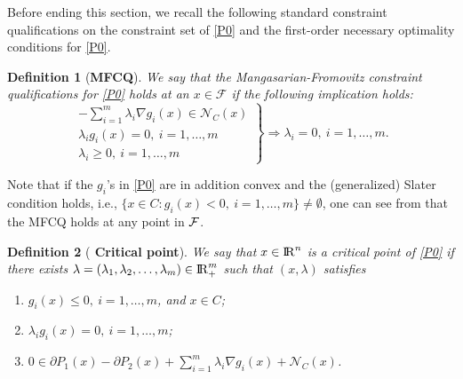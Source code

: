 \documentclass[10pt]{article}
\numberwithin{equation}{section}
\newtheorem{definition}{Definition}[section]
\def\R{{\rm I\!R}}
\begin{document}
Before ending this section, we recall the following standard constraint qualifications on the constraint set of \eqref{P0} and the first-order necessary optimality conditions for \eqref{P0}.
\begin{definition}[{{\bf MFCQ}}]\label{MFCQ1}
We say that the Mangasarian-Fromovitz constraint qualifications for \eqref{P0} holds at an $x\in \mathcal{F}$ if the following implication holds:
\[
\left.\begin{matrix}
-\sum\limits_{i=1}^m\lambda_i \nabla g_i(x)\in \mathcal{N}_C(x)\\
\lambda_ig_i(x) =0, ~ i = 1, \ldots, m\\
\lambda_i\geq 0, ~ i = 1, \ldots, m
\end{matrix}\right\} \Rightarrow\lambda_i =0, ~ i = 1,\ldots, m.
\]
\end{definition}
Note that if the $g_i$'s in \eqref{P0} are in addition convex and the (generalized) Slater condition holds, i.e., $\{x \in C: g_i(x) < 0, ~ i = 1, \ldots, m\} \neq \emptyset $, {\color{blue} one can see from \cite[p341]{Ber95} that the MFCQ holds at any point in ${\cal F}$.}
\begin{definition}[{{\bf {\color{blue} Critical point}}}]\label{Stationary}
We say that $x\in\R^n$ is a {\color{blue}critical point} of \eqref{P0} if there exists $\lambda = (\lambda_1, \lambda_2, \ldots, \lambda_m)\in\R_+^m$ such that $(x,\lambda)$ satisfies
 \begin{enumerate}[{\rm (i)}]
   \item $g_i(x) \leq 0, ~ i = 1, \ldots, m$, and $x\in C$;
   \item $\lambda_ig_i(x)=0, ~ i = 1, \ldots, m$;
   \item $0\in\partial P_1(x) - \partial P_2(x) + \sum\limits_{i=1}^m\lambda_i \nabla g_i(x) + \mathcal{N}_C(x)$.
 \end{enumerate}
\end{definition}
\end{document}
